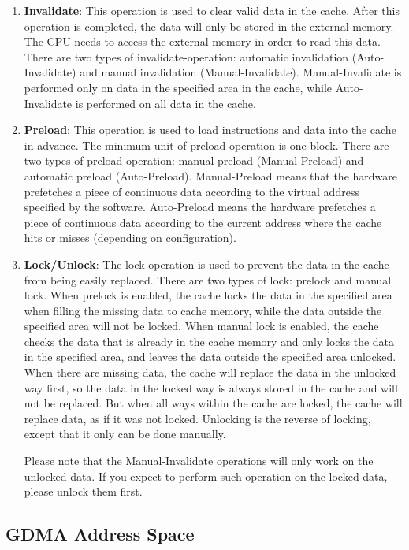 \documentclass[main\_\_EN.tex]{subfiles}
\begin{document}
\begin{enumerate}
\item \textbf{Invalidate}: This operation is used to clear valid data in the cache. After this operation is completed, the data will only be stored in the external memory. The CPU needs to access the external memory in order to read this data. There are two types of invalidate-operation: automatic invalidation (Auto-Invalidate) and manual invalidation (Manual-Invalidate). Manual-Invalidate is performed only on data in the specified area in the cache, while Auto-Invalidate is performed on all data in the cache.

\item \textbf{Preload}: This operation is used to load instructions and data into the cache in advance. The minimum unit of preload-operation is one block. There are two types of preload-operation: manual preload (Manual-Preload) and automatic preload (Auto-Preload). Manual-Preload means that the hardware prefetches a piece of continuous data according to the virtual address specified by the software. Auto-Preload means the hardware prefetches a piece of continuous data according to the current address where the cache hits or misses (depending on configuration).

\item \textbf{Lock/Unlock}: The lock operation is used to prevent the data in the cache from being easily replaced. There are two types of lock: prelock and manual lock. When prelock is enabled, the cache locks the data in the specified area when filling the missing data to cache memory, while the data outside the specified area will not be locked. When manual lock is enabled, the cache checks the data that is already in the cache memory and only locks the data in the specified area, and leaves the data outside the specified area unlocked. When there are missing data, the cache will replace the data in the unlocked way first, so the data in the locked way is always stored in the cache and will not be replaced. But when all ways within the cache are locked, the cache will replace data, as if it was not locked. Unlocking is the reverse of locking, except that it only can be done manually.

Please note that the Manual-Invalidate operations will only work on the unlocked data. If you expect to perform such operation on the locked data, please unlock them first.
\end{enumerate}



\subsection{GDMA Address Space}
\end{document}
